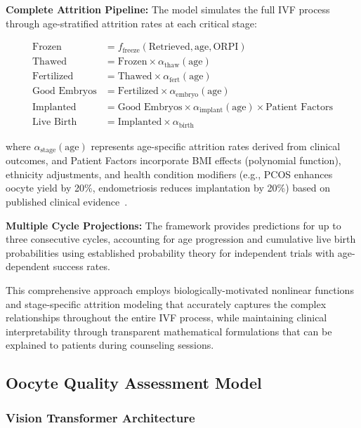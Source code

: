 \textbf{Complete Attrition Pipeline:}
The model simulates the full IVF process through age-stratified attrition rates at each critical stage:

\begin{align}
\text{Frozen} &= f_{\text{freeze}}(\text{Retrieved}, \text{age}, \text{ORPI}) \\
\text{Thawed} &= \text{Frozen} \times \alpha_{\text{thaw}}(\text{age}) \\
\text{Fertilized} &= \text{Thawed} \times \alpha_{\text{fert}}(\text{age}) \\
\text{Good Embryos} &= \text{Fertilized} \times \alpha_{\text{embryo}}(\text{age}) \\
\text{Implanted} &= \text{Good Embryos} \times \alpha_{\text{implant}}(\text{age}) \times \text{Patient Factors} \\
\text{Live Birth} &= \text{Implanted} \times \alpha_{\text{birth}}
\end{align}

where $\alpha_{\text{stage}}(\text{age})$ represents age-specific attrition rates derived from clinical outcomes, and Patient Factors incorporate BMI effects (polynomial function), ethnicity adjustments, and health condition modifiers (e.g., PCOS enhances oocyte yield by 20\%, endometriosis reduces implantation by 20\%) based on published clinical evidence~\cite{lee2017amh}.

\textbf{Multiple Cycle Projections:}
The framework provides predictions for up to three consecutive cycles, accounting for age progression and cumulative live birth probabilities using established probability theory for independent trials with age-dependent success rates.

This comprehensive approach employs biologically-motivated nonlinear functions and stage-specific attrition modeling that accurately captures the complex relationships throughout the entire IVF process, while maintaining clinical interpretability through transparent mathematical formulations that can be explained to patients during counseling sessions.

\subsection{Oocyte Quality Assessment Model}\label{subsec:quality}

\subsubsection{Vision Transformer Architecture}

